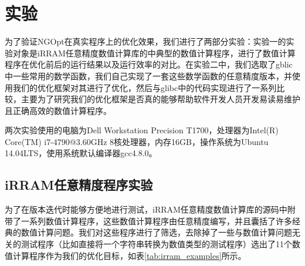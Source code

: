 \section{实验}

为了验证NGOpt在真实程序上的优化效果，我们进行了两部分实验：实验一的实验对象是iRRAM任意精度数值计算库的中典型的数值计算程序，进行了数值计算程序在优化前后的运行结果以及运行效率的对比。在实验二中，我们选取了gblic中一些常用的数学函数，我们自己实现了一套这些数学函数的任意精度版本，并使用我们的优化框架对其进行了优化，然后与glibc中的代码实现进行了一系列比较，主要为了研究我们的优化框架是否真的能够帮助软件开发人员开发易读易维护且正确高效的数值计算程序。

两次实验使用的电脑为Dell Workstation Precision T1700，处理器为Intel(R) Core(TM) i7-4790@3.60GHz 8核处理器，内存16GB，操作系统为Ubuntu 14.04LTS，使用系统默认编译器gcc4.8.0。

\subsection{iRRAM任意精度程序实验}

为了在版本迭代时能够方便地进行测试，iRRAM任意精度数值计算库的源码中附带了一系列数值计算程序，这些数值计算程序由任意精度编写，并且囊括了许多经典的数值计算问题。我们对这些程序进行了筛选，去除掉了一些与数值计算问题无关的测试程序（比如直接将一个字符串转换为数值类型的测试程序）选出了11个数值计算程序作为我们的优化目标，如表\ref{tab:irram_examples}所示。

